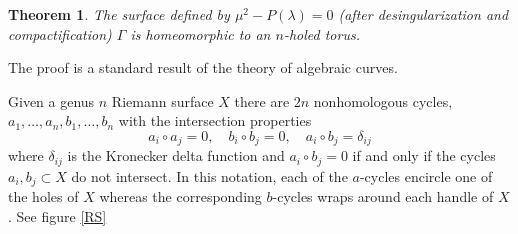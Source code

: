 \documentclass[12pt, a4paper]{article}
\newtheorem{theorem}{Theorem}
\begin{document}
\begin{theorem}
The surface defined by $\mu^2 - P(\lambda) = 0$ (after desingularization
and compactification) $\Gamma$ is homeomorphic to an $n$-holed torus.
\end{theorem}

The proof is a standard result of the theory of algebraic curves.

Given a genus $n$ Riemann surface $X$ there are $2n$ nonhomologous
cycles, $a_1,\ldots,a_n,b_1,\ldots,b_n$ with the intersection properties
\begin{equation*}
  a_i \circ a_j = 0,
  \quad
  b_i \circ b_j = 0,
  \quad
  a_i \circ b_j = \delta_{ij}
\end{equation*}
where $\delta_{ij}$ is the Kronecker delta function and $a_i \circ b_j =
0$ if and only if the cycles $a_i,b_j \subset X$ do not intersect. In
this notation, each of the $a$-cycles encircle one of the holes of $X$
whereas the corresponding $b$-cycles wraps around each handle of $X$.
See figure \ref{RS}
\end{document}
